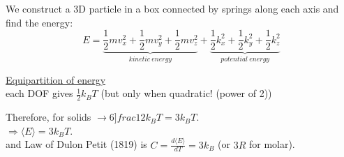 \documentclass[english, 11pt]{article}
\begin{document}
		We construct a 3D particle in a box connected by springs along each axis and find the energy:
		\begin{equation*}
			E = \underbrace{\frac{1}{2} m v_x^2 + \frac{1}{2} m v_y^2 + \frac{1}{2} m v_z^2}_{kinetic\ energy} +
				\underbrace{\frac{1}{2} k_x^2 + \frac{1}{2} k_y^2 + \frac{1}{2} k_z^2}_{potential\ energy}
		\end{equation*}

		\underline{Equipartition of energy}\\
			each DOF gives $\frac{1}{2} k_B T$  (but only when quadratic!  (power of 2))
		
		Therefore, for solids $\rightarrow 6 ]frac{1}{2} k_B T = 3 k_B T$. \\
		$\Rightarrow \langle E\rangle = 3 k_B T$. \\
		and Law of Dulon Petit (1819) is $C = \frac{d \langle E\rangle}{dT} = 3k_B$ (or $3R$ for molar).\\

	
\end{document}
